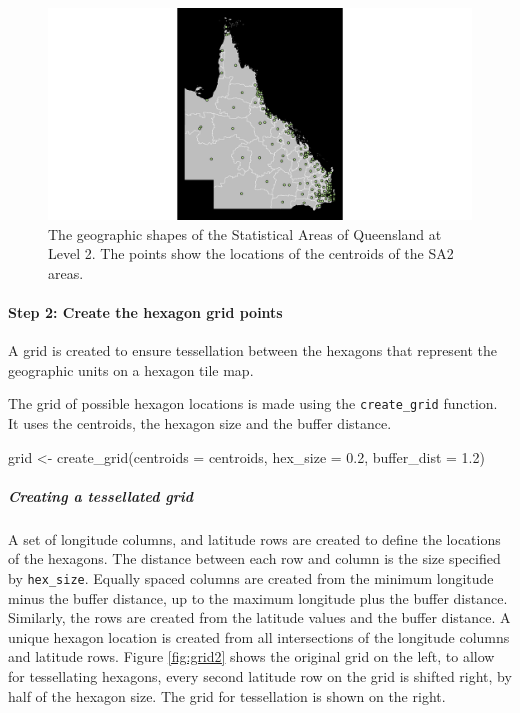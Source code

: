 \begin{figure}[h]
\centering
\includegraphics[width=14cm]{figs/1centroids.pdf}
\caption{\label{fig:centroids_plot}The geographic shapes of the Statistical Areas of Queensland at Level 2. The points show the locations of the centroids of the SA2 areas.}
\end{figure}

\hypertarget{step-2-create-the-hexagon-grid-points}{%
\paragraph{Step 2: Create the hexagon grid
points}\label{step-2-create-the-hexagon-grid-points}}

A grid is created to ensure tessellation between the hexagons that
represent the geographic units on a hexagon tile map.

The grid of possible hexagon locations is made using the
\texttt{create\_grid} function. It uses the centroids, the hexagon size
and the buffer distance.

\begin{Schunk}
\begin{Sinput}
grid <- create_grid(centroids = centroids, hex_size = 0.2, buffer_dist = 1.2)
\end{Sinput}
\end{Schunk}

\hypertarget{creating-a-tessellated-grid}{%
\subparagraph{Creating a tessellated
grid}\label{creating-a-tessellated-grid}}

A set of longitude columns, and latitude rows are created to define the
locations of the hexagons. The distance between each row and column is
the size specified by \texttt{hex\_size}. Equally spaced columns are
created from the minimum longitude minus the buffer distance, up to the
maximum longitude plus the buffer distance. Similarly, the rows are
created from the latitude values and the buffer distance. A unique
hexagon location is created from all intersections of the longitude
columns and latitude rows. Figure \ref{fig:grid2} shows the original
grid on the left, to allow for tessellating hexagons, every second
latitude row on the grid is shifted right, by half of the hexagon size.
The grid for tessellation is shown on the right.

